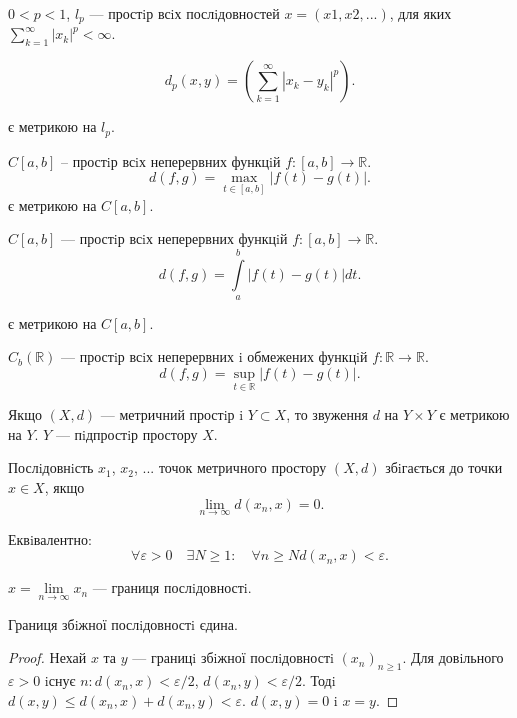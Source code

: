 \begin{example}
    $0 < p < 1$, $l_p$ --- простiр всiх послiдовностей $x = (x1, x2, ...)$, для яких
    $\sum\limits_{k=1}^{\infty} |x_k|^p < \infty$.
    
    $$d_p(x, y) = \left( \sum\limits_{k=1}^{\infty} |x_k - y_k|^p \right).$$
    
    є метрикою на $l_p$.
\end{example}

\begin{example}
    $C[a, b]$ – простiр всiх неперервних функцiй $f: [a, b] \rightarrow \mathbb{R}$.
    $$d(f, g) = \max\limits_{t \in [a,b]} |f(t) - g(t)|.$$
    є метрикою на $C[a, b]$.
\end{example}

\begin{example}
    $C[a, b]$ --- простiр всiх неперервних функцiй $f: [a, b] \rightarrow \mathbb{R}$.
    $$d(f, g) = \int\limits_{a}^{b} |f(t) - g(t)| dt.$$

    є метрикою на $C[a, b]$.
\end{example}

\begin{example}
    $C_b(\mathbb{R})$ --- простiр всiх неперервних i обмежених функцiй
    $f: \mathbb{R} \rightarrow \mathbb{R}$.
    $$d(f, g) = \sup\limits_{t \in \mathbb{R}} |f(t) - g(t)|.$$
\end{example}

\begin{claim}[Пiдпростiр]
    Якщо $(X, d)$ --- метричний простiр i $Y \subset X$, то звуження $d$ на
    $Y \times Y$ є метрикою на $Y$. $Y$ --- пiдпростiр простору $X$.
\end{claim}

\begin{definition}
    Послiдовнiсть $x_1$, $x_2$, ... точок метричного простору $(X, d)$
    збiгається до точки $x \in X$, якщо
    $$\lim\limits_{n \rightarrow \infty} d(x_n, x) = 0.$$
    
    Еквiвалентно:
    $$\forall \varepsilon > 0 \quad
    \exists N \geqslant 1: \quad
    \forall n \geqslant N d(x_n, x) <
    \varepsilon.$$
\end{definition}

$x = \lim\limits_{n \rightarrow \infty} x_n$ --- границя послiдовностi.

\begin{theorem}
    Границя збiжної послiдовностi єдина.
\end{theorem}
\begin{proof}
    Нехай $x$ та $y$ --- границi збiжної послiдовностi $(x_n)_{n \geqslant 1}$.
    Для довiльного $\varepsilon > 0$ iснує $n: d(x_n, x) < \varepsilon/2$, $d(x_n, y) < \varepsilon/2$.
    Тодi $d(x, y) \leqslant d(x_n, x) + d(x_n, y) < \varepsilon$. $d(x, y) = 0$ i $x = y$.
\end{proof}

